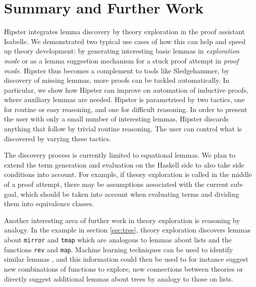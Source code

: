\section{Summary and Further Work}
\label{sec:concl}

Hipster integrates lemma discovery by theory exploration in the proof assistant Isabelle. We demonstrated two typical use cases of how this can help and speed up theory development: by generating interesting basic lemmas in \emph{exploration mode} or as a lemma suggestion mechanism for a stuck proof attempt in \emph{proof mode}. Hipster thus becomes a complement to tools like Sledgehammer, by discovery of missing lemmas, more proofs can be tackled automatically. In particular, we show how Hipster can improve on automation of inductive proofs, where auxiliary lemmas are needed. Hipster is parametrised by two tactics, one for routine or easy reasoning, and one for difficult reasoning. In order to present the user with only a small number of interesting lemmas, Hipster discards anything that follow by trivial routine reasoning. The user can control what is discovered by varying these tactics.

The discovery process is currently limited to equational lemmas. We plan to extend the term generation and evaluation on the Haskell side to also take side conditions into account. For example, if theory exploration is called in the middle of a proof attempt, there may be assumptions associated with the current sub-goal, which should be taken into account when evaluating terms and dividing them into equivalence classes. 

Another interesting area of further work in theory exploration is reasoning by analogy. In the example in section \ref{sec:tree}, theory exploration discovers lemmas about \texttt{mirror} and \texttt{tmap} which are analogous to lemmas about lists and the functions \texttt{rev} and \texttt{map}. Machine learning techniques can be used to identify similar lemmas \cite{acl2ml}, and this information could then be used to for instance suggest new combinations of functions to explore, new connections between theories or directly suggest additional lemmas about trees by analogy to those on lists.  


